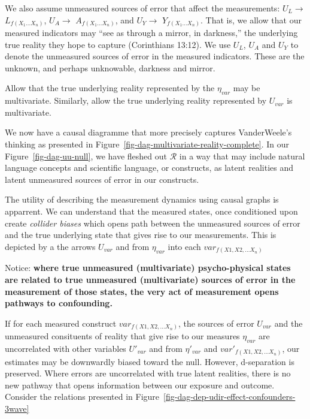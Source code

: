 \documentclass[
  singlecolumn]{report}
\begin{document}
We also assume unmeasured sources of error that affect the measurements:
\(U_{L} \rightarrow\) \(L_{f(X_1\dots X_n)}\), \(U_{A} \rightarrow\)
\(A_{f(X_1\dots X_n)}\), and \(U_{Y} \rightarrow\)
\(Y_{f(X_1\dots X_n)}\). That is, we allow that our measured indicators
may ``see as through a mirror, in darkness,'' the underlying true
reality they hope to capture (Corinthians 13:12). We use \(U_{L}\),
\(U_{A}\) and \(U_{Y}\) to denote the unmeasured sources of error in the
measured indicators. These are the unknown, and perhaps unknowable,
darkness and mirror.

Allow that the true underlying reality represented by the \(\eta_{var}\)
may be multivariate. Similarly, allow the true underlying reality
represented by \(U_{var}\) is multivariate.

We now have a causal diagramme that more precisely captures
VanderWeele's thinking as presented in
Figure~\ref{fig-dag-multivariate-reality-complete}. In our
Figure~\ref{fig-dag-uu-null}, we have fleshed out \(\mathcal{R}\) in a
way that may include natural language concepts and scientific language,
or constructs, as latent realities and latent unmeasured sources of
error in our constructs.

The utility of describing the measurement dynamics using causal graphs
is apparrent. We can understand that the measured states, once
conditioned upon create \emph{collider biases} which opens path between
the unmeasured sources of error and the true underlying state that gives
rise to our measurements. This is depicted by a the arrows \(U_{var}\)
and from \(\eta_{var}\) into each \(var_{f(X1, X2,\dots X_n)}\)

Notice: \textbf{where true unmeasured (multivariate) psycho-physical
states are related to true unmeasured (multivariate) sources of error in
the measurement of those states, the very act of measurement opens
pathways to confounding.}

If for each measured construct \(var_{f(X1, X2,\dots X_n)}\), the
sources of error \(U_{var}\) and the unmeasured consituents of reality
that give rise to our measures \(\eta_{var}\) are uncorrelated with
other variables \(U\prime_{var}\) and from \(\eta\prime_{var}\) and
\(var\prime_{f(X1, X2,\dots X_n)}\), our estimates may be downwardly
biased toward the null. However, d-separation is preserved. Where errors
are uncorrelated with true latent realities, there is no new pathway
that opens information between our exposure and outcome. Consider the
relations presented in
Figure~\ref{fig-dag-dep-udir-effect-confounders-3wave}
\end{document}
